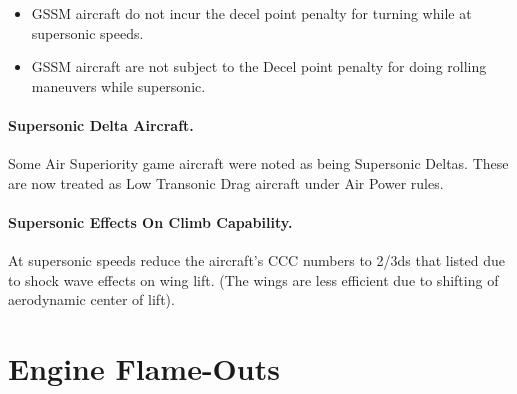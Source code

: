 \begin{advancedrules}
\begin{itemize}

    \item 
    GSSM aircraft do not incur the decel point penalty for turning while at supersonic speeds.

    \item 
    GSSM aircraft are not subject to the Decel point penalty for doing rolling maneuvers while supersonic.

\end{itemize}

\paragraph{Supersonic Delta Aircraft.} Some Air Superiority game aircraft were noted as being Supersonic Deltas. These are now treated as Low Transonic Drag aircraft under Air Power rules.

\paragraph{Supersonic Effects On Climb Capability.} At supersonic speeds reduce the aircraft's CCC numbers to 2/3ds that listed due to shock wave effects on wing lift. (The wings are less efficient due to shifting of aerodynamic center of lift).


\section{Engine Flame-Outs}
\label{rule:engine-flame-outs}


\end{advancedrules}
